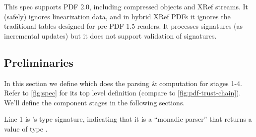 This spec supports PDF 2.0, including compressed objects and XRef streams.
%
It (safely) ignores linearization data, and in hybrid XRef PDFs
it ignores the traditional \xref{} tables designed for pre PDF 1.5 readers.
It processes signatures (as incremental updates) but it does not support
validation of signatures.


\subsection{Preliminaries}
\iffalse
\begin{code}
{-# LANGUAGE EmptyDataDecls, TypeOperators, LambdaCase #-}
module Spec where
import           Control.Monad
import           Data.Char
import           Data.Foldable(foldlM)
import qualified Data.IntSet as IntSet
import           Data.List
import qualified Data.Map as M
import           Data.Map(Map)
import           Types
import           Utils
import           Primitives
import           Streams
\end{code}
\fi

In this section we define  which does the parsing \&
computation for stages 1-4.
% 
Refer to \cref{fig:spec} for its top level definition (compare to
\cref{fig:pdf-trust-chain}).  We'll define the component stages in the
following sections.

Line 1 is 's type signature, indicating 
that it is a ``monadic parser''  that returns a
value of type .

